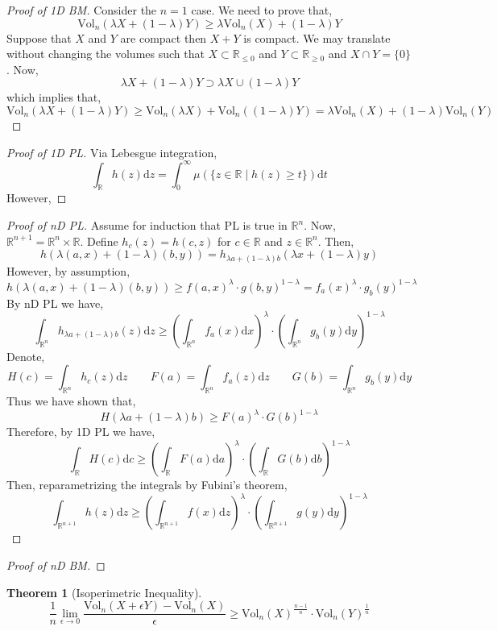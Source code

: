\documentclass[12pt]{extarticle}
\newcommand{\R}{\mathbb{R}}
\theoremstyle{definition}
\newtheorem{theorem}{Theorem}[section]
\renewcommand{\d}[1]{\mathrm{d} #1}
\newcommand{\Vol}[2]{\mathrm{Vol}_{#1}\left( #2 \right)}
\begin{document}
\begin{proof}[Proof of 1D BM]
Consider the $n = 1$ case. We need to prove that,
\[ \Vol{n}{\lambda X + (1 - \lambda)Y} \ge \lambda \Vol{n}{X} + (1 - \lambda) Y \]
Suppose that $X$ and $Y$ are compact then $X + Y$ is compact. We may translate without changing the volumes such that $X \subset \R_{\le 0}$ and $Y \subset \R_{\ge 0}$ and $X \cap Y = \{0 \}$. Now,
\[ \lambda X + (1 - \lambda) Y \supset \lambda X \cup (1 - \lambda) Y  \]
which implies that,
\[ \Vol{n}{\lambda X + (1 - \lambda) Y} \ge \Vol{n}{\lambda X} + \Vol{n}{(1 - \lambda) Y} = \lambda \Vol{n}{X} + (1 - \lambda) \Vol{n}{Y} \]
\end{proof}


\begin{proof}[Proof of 1D PL]
Via Lebesgue integration,
\[ \int_{\R} h(z) \d{z} = \int_0^\infty \mu(\{ z \in \R \mid h(z) \ge t \}) \d{t} \]
However, 
\end{proof}

\begin{proof}[Proof of nD PL]
Assume for induction that PL is true in $\R^n$. Now, $\R^{n+1} = \R^n \times \R$. Define $h_c(z) = h(c, z)$ for $c \in \R$ and $z \in \R^n$. Then,
\[ h(\lambda (a, x) + (1 - \lambda) (b, y)) = h_{\lambda a + (1 - \lambda) b}(\lambda x + (1 - \lambda) y) \]
However, by assumption,
\[ h(\lambda (a, x) + (1 - \lambda) (b, y)) \ge f(a, x)^\lambda \cdot g(b, y)^{1 - \lambda} = f_a(x)^\lambda \cdot g_b(y)^{1 - \lambda} \]
By nD PL we have,
\[ \int_{\R^n} h_{\lambda a + (1 - \lambda) b}(z) \d{z} \ge \left( \int_{\R^n} f_a(x) \d{x} \right)^\lambda \cdot \left( \int_{\R^n} g_b(y) \d{y} \right)^{1 - \lambda} \]
Denote,
\[ H(c) = \int_{\R^n} h_c(z) \d{z} \quad \quad F(a) = \int_{\R^n} f_a(z) \d{z} \quad \quad G(b) = \int_{\R^n} g_b(y) \d{y} \]
Thus we have shown that,
\[ H(\lambda a + (1 - \lambda) b) \ge F(a)^\lambda \cdot G(b)^{1 - \lambda} \]
Therefore, by 1D PL we have,
\[ \int_\R H(c) \d{c} \ge \left( \int_\R F(a) \d{a} \right)^\lambda \cdot \left( \int_\R G(b) \d{b} \right)^{1 - \lambda} \]
Then, reparametrizing the integrals by Fubini's theorem,
\[ \int_{\R^{n+1}} h(z) \d{z} \ge \left( \int_{\R^{n+1}} f(x) \d{z} \right)^\lambda \cdot \left( \int_{\R^{n+1}} g(y) \d{y} \right)^{1 - \lambda} \]
\end{proof}

\begin{proof}[Proof of nD BM]

\end{proof}

\begin{theorem}[Isoperimetric Inequality]
\[ \frac{1}{n} \lim_{\epsilon \to 0} \frac{\Vol{n}{X + \epsilon Y} - \Vol{n}{X}}{\epsilon} \ge \Vol{n}{X}^{\frac{n-1}{n}} \cdot \Vol{n}{Y}^{\frac{1}{n}} \]
\end{theorem}
\end{document}
